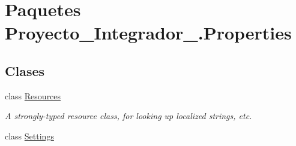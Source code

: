 \hypertarget{namespace_proyecto___integrador__3_1_1_properties}{\section{Paquetes Proyecto\-\_\-\-Integrador\-\_.\-Properties}
\label{namespace_proyecto___integrador__3_1_1_properties}
}
\subsection*{Clases}
\begin{DoxyCompactItemize}
\item 
class \hyperlink{class_proyecto___integrador__3_1_1_properties_1_1_resources}{Resources}
\begin{DoxyCompactList}\small\item\em A strongly-\/typed resource class, for looking up localized strings, etc. \end{DoxyCompactList}\item 
class \hyperlink{class_proyecto___integrador__3_1_1_properties_1_1_settings}{Settings}
\end{DoxyCompactItemize}
